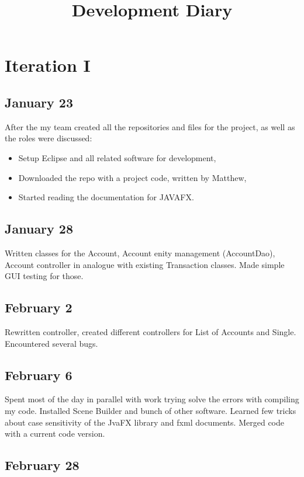 \documentclass[11pt,letterpaper]{article}
\begin{document}
\title{Development Diary}

\section*{Iteration I}

\subsection*{January 23}

After the my team created all the repositories and files for the project, as well as the roles were discussed:
\begin{itemize}
\item Setup Eclipse and all related software for development,
\item Downloaded the repo with a project code, written by Matthew,
\item Started reading the documentation for JAVAFX.
\end{itemize}

\subsection*{January 28}

Written classes for the Account, Account enity management (AccountDao), Account controller in analogue with existing Transaction classes. Made simple GUI testing for those.

\subsection*{February 2}
Rewritten controller, created different controllers for List of Accounts and Single. Encountered several bugs.


\subsection*{February 6}

Spent most of the day in parallel with work trying solve the errors with compiling my code. Installed Scene Builder and bunch of other software. Learned few tricks about case sensitivity of the JvaFX library and fxml documents. Merged code with a current code version.

\subsection*{February 28}
\end{document}
